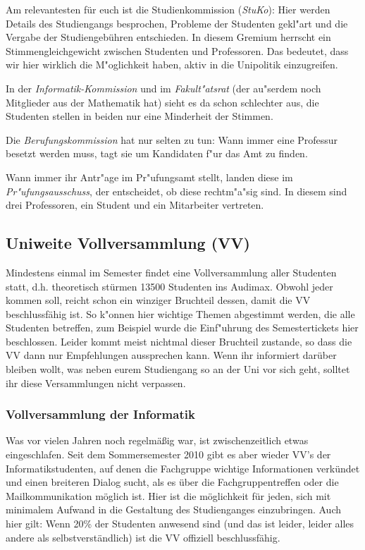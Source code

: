 \begin{multicols}{2}
		Am relevantesten für euch ist die Studienkommission (\emph{StuKo}): Hier werden Details des Studiengangs besprochen, Probleme der Studenten gekl"art und die Vergabe der Studiengebühren entschieden. In diesem Gremium herrscht ein Stimmengleichgewicht zwischen Studenten und Professoren. Das bedeutet, dass wir hier wirklich die M"oglichkeit haben, aktiv in die Unipolitik einzugreifen.

		In der \emph{Informatik-Kommission} und im \emph{Fakult"atsrat} (der au"serdem noch Mitglieder aus der Mathematik hat) sieht es da schon schlechter aus, die Studenten stellen in beiden nur eine Minderheit der Stimmen.

		Die \emph{Berufungskommission} hat nur selten zu tun: Wann immer eine Professur besetzt werden muss, tagt sie um Kandidaten f"ur das Amt zu finden.

		Wann immer ihr Antr"age im Pr"ufungsamt stellt, landen diese im \emph{Pr"ufungsausschuss}, der entscheidet, ob diese rechtm"a"sig sind. In diesem sind drei Professoren, ein Student und ein Mitarbeiter vertreten.

	\subsection*{Uniweite Vollversammlung (VV)}
		Mindestens einmal im Semester findet eine Vollversammlung aller Studenten statt, d.h. theoretisch stürmen 13500 Studenten ins Audimax. Obwohl jeder kommen soll, reicht schon ein winziger Bruchteil dessen, damit die VV beschlussfähig ist. So k"onnen hier wichtige Themen abgestimmt werden, die alle Studenten betreffen, zum Beispiel wurde die Einf"uhrung des Semestertickets hier beschlossen. Leider kommt meist nichtmal dieser Bruchteil zustande, so dass die VV dann nur Empfehlungen aussprechen kann. Wenn ihr informiert darüber bleiben wollt, was neben eurem Studiengang so an der Uni vor sich geht, solltet ihr diese Versammlungen nicht verpassen.

		\subsubsection*{Vollversammlung der Informatik}
			Was vor vielen Jahren noch regelmäßig war, ist zwischenzeitlich etwas eingeschlafen. Seit dem Sommersemester 2010 gibt es aber wieder VV's der Informatikstudenten, auf denen die Fachgruppe wichtige Informationen verkündet und einen breiteren Dialog sucht, als es über die Fachgruppentreffen oder die Mailkommunikation möglich ist. Hier ist die möglichkeit für jeden, sich mit minimalem Aufwand in die Gestaltung des Studienganges einzubringen. Auch hier gilt: Wenn 20\% der Studenten anwesend sind (und das ist leider, leider alles andere als selbstverständlich) ist die VV offiziell beschlussfähig.
\end{multicols}